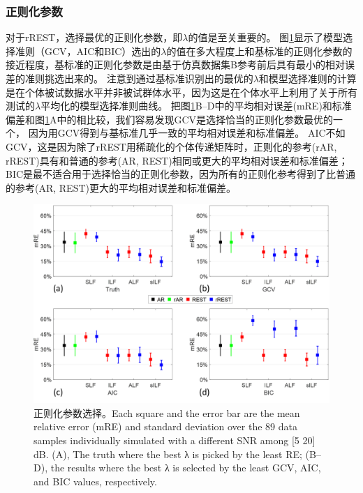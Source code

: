 \subsubsection{正则化参数}
对于rREST，选择最优的正则化参数，即$\lambda$的值是至关重要的。 图\ref{3.6}显示了模型选择准则（GCV，AIC和BIC）选出的$\lambda$的值在多大程度上和基标准的正则化参数的接近程度，基标准的正则化参数是由基于仿真数据集B参考前后具有最小的相对误差的准则挑选出来的。 注意到通过基标准识别出的最优的$\lambda$和模型选择准则的计算是在个体被试数据水平并非被试群体水平，因为这是在个体水平上利用了关于所有测试的$\lambda$平均化的模型选择准则曲线。 把图\ref{3.6}B–D中的平均相对误差(mRE)和标准偏差和图\ref{3.6}A中的相比较，我们容易发现GCV是选择恰当的正则化参数最优的一个，
因为用GCV得到与基标准几乎一致的平均相对误差和标准偏差。 AIC不如GCV，这是因为除了rREST用稀疏化的个体传递矩阵时，正则化的参考(rAR, rREST)具有和普通的参考(AR, REST)相同或更大的平均相对误差和标准偏差； BIC是最不适合用于选择恰当的正则化参数，因为所有的正则化参考得到了比普通的参考(AR, REST)更大的平均相对误差和标准偏差。
\begin{figure}[!ht]
	\centering
	\includegraphics[width=15cm]{pic/Frontier/figure6.png}
	\caption{正则化参数选择。Each square and the error bar are the mean relative error (mRE) and standard deviation over the 89 data samples individually simulated with a different SNR among [5 20] dB. (A), The truth where the best λ is picked by the least RE; (B–D), the results where the best λ is selected
		by the least GCV, AIC, and BIC values, respectively.}
	\label{3.6}
\end{figure}


